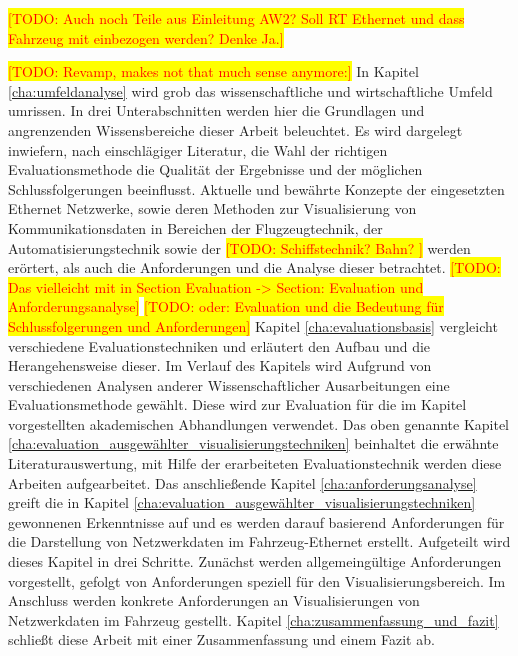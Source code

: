 \documentclass[draft=false
              ,paper=a4
              ,twoside=false
              ,fontsize=11pt
              ,headsepline
              ,BCOR10mm
              ,DIV11
              ]{scrbook}
\newcommand{\TODO}[1]{\colorbox{yellow}{\textcolor{red}{[TODO: #1]}}}
\begin{document}
\TODO{Auch noch Teile aus Einleitung AW2? Soll RT Ethernet und dass Fahrzeug mit einbezogen werden? Denke Ja.}

\TODO{Revamp, makes not that much sense anymore:}
In Kapitel \ref{cha:umfeldanalyse} wird grob das wissenschaftliche und wirtschaftliche Umfeld umrissen. In drei Unterabschnitten werden hier die Grundlagen und angrenzenden Wissensbereiche dieser Arbeit beleuchtet. Es wird dargelegt inwiefern, nach einschlägiger Literatur, die Wahl der richtigen Evaluationsmethode die Qualität der Ergebnisse und der möglichen Schlussfolgerungen beeinflusst. Aktuelle und bewährte Konzepte der eingesetzten Ethernet Netzwerke, sowie deren Methoden zur Visualisierung von Kommunikationsdaten in Bereichen der Flugzeugtechnik, der Automatisierungstechnik sowie der \TODO{Schiffstechnik? Bahn? } werden erörtert, als auch die Anforderungen und die Analyse dieser betrachtet.  \TODO{Das vielleicht mit in Section Evaluation -> Section: Evaluation und Anforderungsanalyse} \TODO{oder: Evaluation und die Bedeutung für Schlussfolgerungen und Anforderungen}
Kapitel \ref{cha:evaluationsbasis} vergleicht verschiedene Evaluationstechniken und erläutert den Aufbau und die Herangehensweise dieser. Im Verlauf des Kapitels wird Aufgrund von verschiedenen Analysen anderer Wissenschaftlicher Ausarbeitungen eine Evaluationsmethode gewählt. Diese wird zur Evaluation für die im Kapitel  vorgestellten akademischen Abhandlungen verwendet. Das oben genannte Kapitel \ref{cha:evaluation_ausgewählter_visualisierungstechniken} beinhaltet die erwähnte Literaturauswertung, mit Hilfe der erarbeiteten Evaluationstechnik werden diese Arbeiten aufgearbeitet. Das anschließende Kapitel \ref{cha:anforderungsanalyse} greift die in Kapitel \ref{cha:evaluation_ausgewählter_visualisierungstechniken} gewonnenen Erkenntnisse auf und es werden darauf basierend Anforderungen für die Darstellung von Netzwerkdaten im Fahrzeug-Ethernet erstellt. Aufgeteilt wird dieses Kapitel in drei Schritte. Zunächst werden allgemeingültige Anforderungen vorgestellt, gefolgt von Anforderungen speziell für den Visualisierungsbereich. Im Anschluss werden konkrete Anforderungen an Visualisierungen von Netzwerkdaten im Fahrzeug gestellt. 
%
 Kapitel \ref{cha:zusammenfassung_und_fazit} schließt diese Arbeit mit einer Zusammenfassung und einem Fazit ab.
\end{document}
